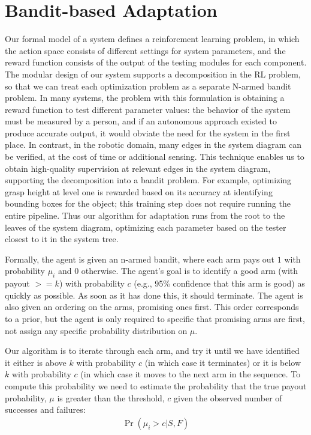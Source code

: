 \documentclass{article}
\begin{document}
\section{Bandit-based Adaptation}

Our formal model of a system defines a reinforcment learning problem,
in which the action space consists of different settings for system
parameters, and the reward function consists of the output of the
testing modules for each component.  The modular design of our system
supports a decomposition in the RL problem, so that we can treat each
optimization problem as a separate N-armed bandit problem.  In many
systems, the problem with this formulation is obtaining a reward
function to test different parameter values: the behavior of the
system must be measured by a person, and if an autonomous approach
existed to produce accurate output, it would obviate the need for the
system in the first place.  In contrast, in the robotic domain, many
edges in the system diagram can be verified, at the cost of time or
additional sensing.  This technique enables us to obtain high-quality
supervision at relevant edges in the system diagram, supporting the
decomposition into a bandit problem.  For example, optimizing grasp
height at level one is rewarded based on its accuracy at identifying
bounding boxes for the object; this training step does not require
running the entire pipeline.  Thus our algorithm for adaptation runs
from the root to the leaves of the system diagram, optimizing each
parameter based on the tester closest to it in the system tree.

Formally, the agent is given an n-armed bandit, where each arm pays
out $1$ with probability $\mu_i$ and $0$ otherwise.  The agent's goal
is to identify a good arm (with payout $>= k$) with probability $c$
(e.g., 95\% confidence that this arm is good) as quickly as possible.
As soon as it has done this, it should terminate.  The agent is also
given an ordering on the arms, promising ones first.  This order
corresponds to a prior, but the agent is only required to specific
that promising arms are first, not assign any specific probability
distribution on $\mu$.


Our algorithm is to iterate through each arm, and try it until we have
identified it either is above $k$ with probability $c$ (in which case
it terminates) or it is below $k$ with probability $c$ (in which case
it moves to the next arm in the sequence.  To compute this probability
we need to estimate the probability that the true payout probability,
$\mu$ is greater than the threshold, $c$ given the observed number of
successes and failures:
\begin{align}
\Pr(\mu_i > c|  S, F)
\end{align}
\end{document}
